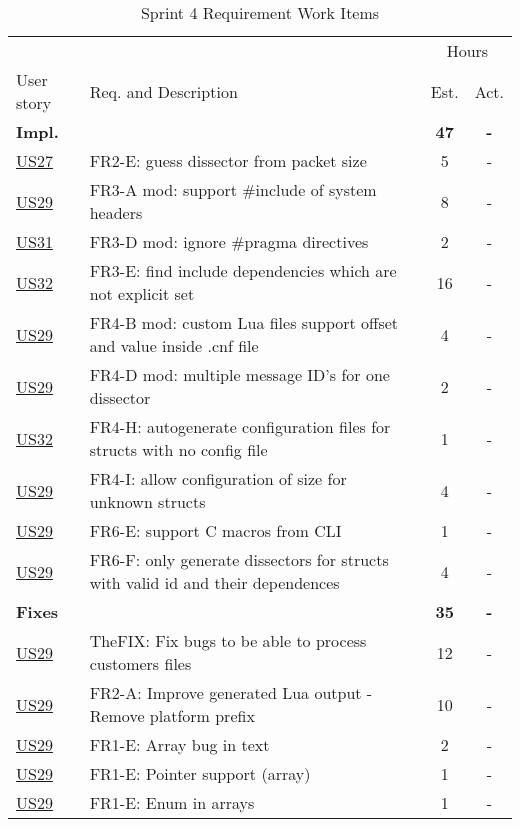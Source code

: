 \begin{table}[!htb] \small \center
\caption{Sprint 4 Requirement Work Items \label{tab:sprint4req}}
\begin{tabularx}{\textwidth}{l X c c}
	\toprule
	& & \multicolumn{2}{c}{Hours} \\
	\cmidrule(r){3-4}
	User story & Req. and Description & Est. & Act. \\
	\midrule
	\textbf{Impl.} &  & \textbf{47} & \textbf{-} \\
	\hyperref[tab:req:stories7]{US27} & FR2-E: guess dissector from packet size & 5 & - \\
	\hyperref[tab:req:stories7]{US29} & FR3-A mod: support \#include of system headers &  8  & - \\
	\hyperref[tab:req:stories8]{US31} & FR3-D mod: ignore \#pragma directives & 2 & - \\
	\hyperref[tab:req:stories8]{US32} & FR3-E: find include dependencies which are not explicit set & 16  & - \\
	\hyperref[tab:req:stories7]{US29} & FR4-B mod: custom Lua files support offset and value inside .cnf file & 4 & - \\
	\hyperref[tab:req:stories7]{US29} & FR4-D mod: multiple message ID's for one dissector & 2 & - \\
	\hyperref[tab:req:stories8]{US32} & FR4-H: autogenerate configuration files for structs with no config file & 1  & - \\
	\hyperref[tab:req:stories7]{US29} & FR4-I: allow configuration of size for unknown structs & 4 & - \\
	\hyperref[tab:req:stories7]{US29} & FR6-E: support C macros from CLI & 1 & - \\
	\hyperref[tab:req:stories7]{US29} & FR6-F: only generate dissectors for structs with valid id and their dependences & 4 & - \\
	\addlinespace
	\textbf{Fixes} &  & \textbf{35} & \textbf{-} \\
	\hyperref[tab:req:stories7]{US29} & TheFIX: Fix bugs to be able to process customers files & 12 & - \\
	\hyperref[tab:req:stories7]{US29} & FR2-A: Improve generated Lua output - Remove platform prefix & 10 & - \\
	\hyperref[tab:req:stories7]{US29} & FR1-E: Array bug in text & 2 & - \\
	\hyperref[tab:req:stories7]{US29} & FR1-E: Pointer support (array) & 1 & - \\
	\hyperref[tab:req:stories7]{US29} & FR1-E: Enum in arrays & 1 & - \\		

\end{tabularx}
\end{table}
